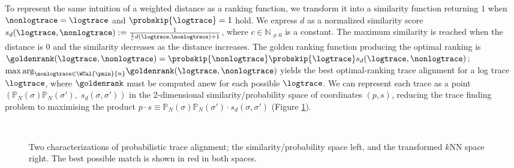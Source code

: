 To represent the same intuition of a weighted distance as a ranking function, we transform it into a
similarity function returning $1$ when $\nonlogtrace=\logtrace$ and $\probskip{\logtrace}=1$ hold. We express $d$ as
a normalized similarity score $s_d(\logtrace,\nonlogtrace):=\frac{1}{\frac{1}{c}d(\logtrace,\nonlogtrace)+1}$, where  
$c\in\mathbb{N}_{\neq0}$ is a constant. The maximum similarity is reached when the distance is $0$ and the similarity decreases 
as the distance increases. 
The golden ranking function producing the optimal ranking is 
$\goldenrank(\logtrace,\nonlogtrace)=\probskip{\nonlogtrace} \probskip{\logtrace} s_d(\logtrace,\nonlogtrace)$;
${\max\arg}_{\nonlogtrace\in \WCal{\pmin}{n}} \goldenrank(\logtrace,{\nonlogtrace})$ yields the best optimal-ranking trace 
alignment for a log trace $\logtrace$, where $\goldenrank$ must be computed anew for each possible $\logtrace$. 
{We can represent each trace as a point  $(\mathbb{P}_N(\sigma)\mathbb{P}_N(\sigma'),\; s_d(\sigma,\sigma'))$ in the 
	2-dimensional similarity/probability space of coordinates $(p,s)$, reducing the trace finding problem to maximising the product 
	$p\cdot s\equiv \mathbb{P}_N(\sigma)\mathbb{P}_N(\sigma')\cdot s_d(\sigma,\sigma')$ (Figure \ref{fig:sps}).}
%
\begin{figure}[!t]
	\centering
	\vspace{-4mm}
	\\
	\caption{Two characterizations of probabilistic trace alignment; the similarity/probability space left, and the transformed
		$k$NN space right. The best possible match is shown in red in both spaces.}\label{fig:sps}
\end{figure}


